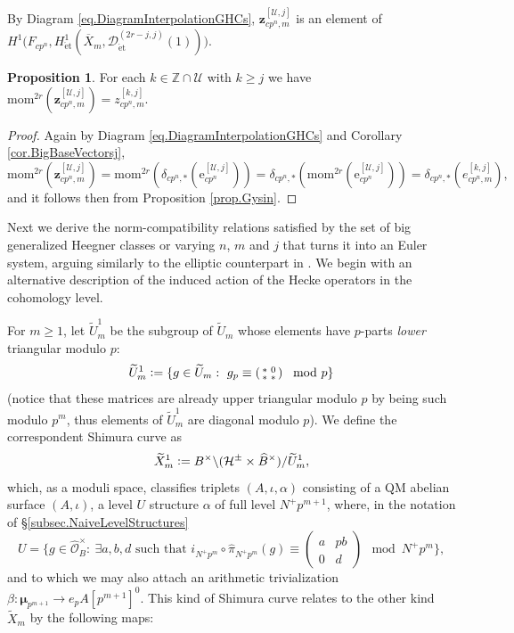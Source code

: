 \documentclass[a4paper]{amsart}
\numberwithin{equation}{section}
\theoremstyle{definition}
\newtheorem{proposition}[theorem]{Proposition}
\newcommand{\Z}{\mathbb{Z}}
\newcommand{\defeq}{\vcentcolon=}
\DeclareMathOperator{\et}{\text{\'et}}
\renewcommand{\et}{\mathrm{\acute{e}t}}
\begin{document}
By Diagram \eqref{eq.DiagramInterpolationGHCs}, $\mathbf{z}^{[\mathscr{U},j]}_{cp^n,m}$ is an element of $H^1\big(F_{cp^n},H^1_{\et}(\overline{X}_m,\mathscr{D}_{\et}^{(2r-j,j)}(1))\big)$.

\begin{proposition}
For each $k\in\Z\cap\mathscr{U}$ with $k\geq j$ we have $\mathrm{mom}^{2r}(\mathbf{z}^{[\mathscr{U},j]}_{cp^n,m})=z_{cp^n,m}^{[k,j]}.$
\end{proposition}
\begin{proof}
Again by Diagram \eqref{eq.DiagramInterpolationGHCs} and Corollary \ref{cor.BigBaseVectorsj}, \[\mathrm{mom}^{2r}(\mathbf{z}^{[\mathscr{U},j]}_{cp^n,m})=\mathrm{mom}^{2r}(\delta_{cp^n,\ast}(\boldsymbol{\mathrm{e}}^{[\mathscr{U},j]}_{cp^n}))=\delta_{cp^n,\ast}(\mathrm{mom}^{2r}(\boldsymbol{\mathrm{e}}^{[\mathscr{U},j]}_{cp^n}))=\delta_{cp^n,\ast}(e_{cp^n,m}^{[k,j]}),\] and it follows then from Proposition \ref{prop.Gysin}.
\end{proof}

Next we derive the norm-compatibility relations satisfied by the set of big generalized Heegner classes or varying $n$, $m$ and $j$ that turns it into an Euler system, arguing similarly to the elliptic counterpart in \cite[Proposition 5.1.2]{JetchevLoefflerZerbes}. We begin with an alternative description of the induced action of the Hecke operators in the cohomology level.

For $m\ge 1$, let $\widetilde{U}^1_m$ be the subgroup of $\widetilde{U}_m$ whose elements have $p$-parts \textit{lower} triangular modulo $p$: \[\widetilde{U}^1_m\defeq\{g\in \widetilde{U}_m:\ g_p\equiv\left(\begin{smallmatrix}* & 0 \\ * & *\end{smallmatrix}\right)\mod p\}\] (notice that these matrices are already upper triangular modulo $p$ by being such modulo $p^m$, thus elements of $\widetilde{U}^1_m$ are diagonal modulo $p$). We define the correspondent Shimura curve as \[\widetilde{X}^1_m\defeq B^\times\backslash (\mathcal{H}^{\pm}\times\widehat{B}^\times)/ \widetilde{U}_m^1,\] which, as a moduli space, classifies triplets $(A,\iota,\alpha)$ consisting of a QM abelian surface $(A,\iota)$, a level $U$ structure $\alpha$ of full level $N^+p^{m+1}$, where, in the notation of \S\ref{subsec.NaiveLevelStructures} \[U=\{g\in\widehat{\mathcal{O}}^\times_B:\ \exists a,b,d\text{ such that }i_{N^{+}p^m}\circ\widehat{\pi}_{N^+p^m}(g)\equiv\left(\begin{smallmatrix}a & pb \\ 0 & d\end{smallmatrix}\right)\mod N^+p^m\},\] and to which we may also attach an arithmetic trivialization $\beta\colon\boldsymbol{\mu}_{p^{m+1}}\to e_pA[p^{m+1}]^0$. This kind of Shimura curve relates to the other kind $\widetilde{X}_m$ by the following maps:
\end{document}
